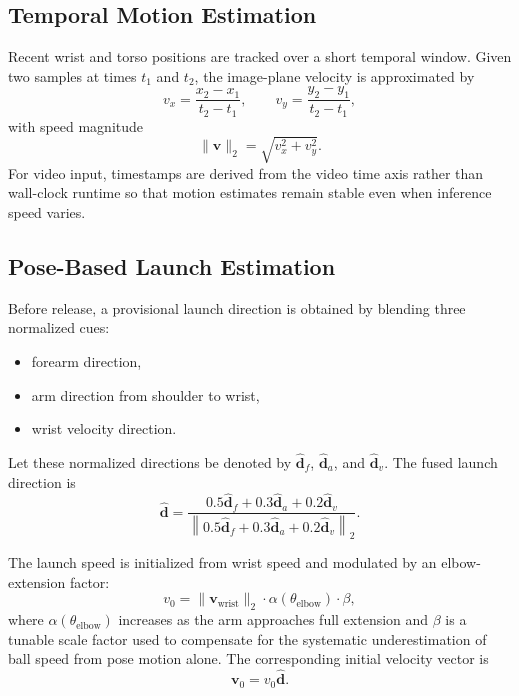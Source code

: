 \documentclass[11pt]{article}
\begin{document}
\subsection{Temporal Motion Estimation}
Recent wrist and torso positions are tracked over a short temporal window. Given two samples at times $t_1$ and $t_2$, the image-plane velocity is approximated by
\begin{equation}
    v_x = \frac{x_2 - x_1}{t_2 - t_1},
    \qquad
    v_y = \frac{y_2 - y_1}{t_2 - t_1},
\end{equation}
with speed magnitude
\begin{equation}
    \|\bm{v}\|_2 = \sqrt{v_x^2 + v_y^2}.
\end{equation}
For video input, timestamps are derived from the video time axis rather than wall-clock runtime so that motion estimates remain stable even when inference speed varies.

\subsection{Pose-Based Launch Estimation}
Before release, a provisional launch direction is obtained by blending three normalized cues:
\begin{itemize}
    \item forearm direction,
    \item arm direction from shoulder to wrist,
    \item wrist velocity direction.
\end{itemize}
Let these normalized directions be denoted by $\hat{\bm{d}}_f$, $\hat{\bm{d}}_a$, and $\hat{\bm{d}}_v$. The fused launch direction is
\begin{equation}
    \hat{\bm{d}}
    =
    \frac{
        0.5\hat{\bm{d}}_f + 0.3\hat{\bm{d}}_a + 0.2\hat{\bm{d}}_v
    }{
        \left\|0.5\hat{\bm{d}}_f + 0.3\hat{\bm{d}}_a + 0.2\hat{\bm{d}}_v\right\|_2
    }.
\end{equation}

The launch speed is initialized from wrist speed and modulated by an elbow-extension factor:
\begin{equation}
    v_0 = \|\bm{v}_{\text{wrist}}\|_2 \cdot \alpha(\theta_{\text{elbow}}) \cdot \beta,
\end{equation}
where $\alpha(\theta_{\text{elbow}})$ increases as the arm approaches full extension and $\beta$ is a tunable scale factor used to compensate for the systematic underestimation of ball speed from pose motion alone. The corresponding initial velocity vector is
\begin{equation}
    \bm{v}_0 = v_0 \hat{\bm{d}}.
\end{equation}
\end{document}

